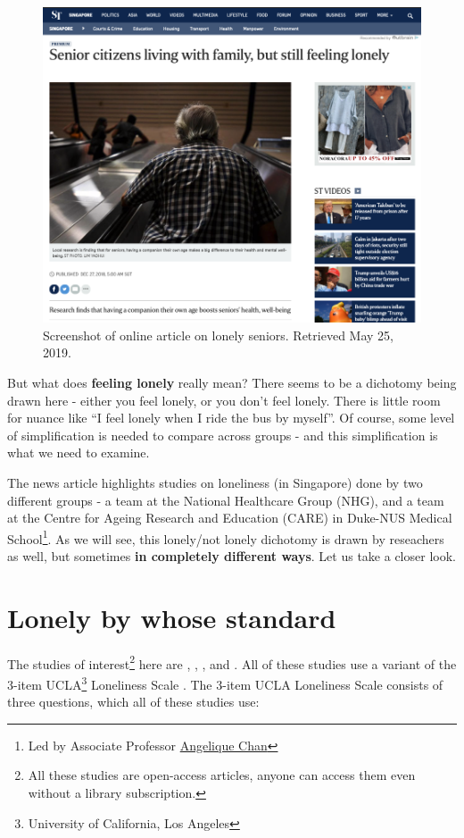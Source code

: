 \documentclass[openany]{book}
\let\rmarkdownfootnote\footnote%
\def\footnote{\protect\rmarkdownfootnote}
\begin{document}
\begin{figure}

{\centering \includegraphics[width=0.8\linewidth]{images/loneliness/livingarr} 

}

\caption{Screenshot of online article on lonely seniors. Retrieved May 25, 2019.}\label{fig:st-lonely}
\end{figure}

But what does \textbf{feeling lonely} really mean? There seems to be a
dichotomy being drawn here - either you feel lonely, or you don't feel
lonely. There is little room for nuance like ``I feel lonely when I ride
the bus by myself''. Of course, some level of simplification is needed
to compare across groups - and this simplification is what we need to
examine.

The news article highlights studies on loneliness (in Singapore) done by
two different groups - a team at the National Healthcare Group (NHG),
and a team at the Centre for Ageing Research and Education (CARE) in
Duke-NUS Medical School\footnote{Led by Associate Professor
  \href{https://www.duke-nus.edu.sg/hssr/our-team/faculty/faculty-staff-details/Detail/13200}{Angelique
  Chan}}. As we will see, this lonely/not lonely dichotomy is drawn by
reseachers as well, but sometimes \textbf{in completely different ways}.
Let us take a closer look.

\section{Lonely by whose standard}\label{lonely-by-whose-standard}

The studies of interest\footnote{All these studies are open-access
  articles, anyone can access them even without a library subscription.}
here are \citet{wee_loneliness_2019}, \citet{ge_social_2017},
\citet{lim_association_2017}, and \citet{chan_loneliness_2015}. All of
these studies use a variant of the 3-item UCLA\footnote{University of
  California, Los Angeles} Loneliness Scale \citep{hughes_short_2004}.
The 3-item UCLA Loneliness Scale consists of three questions, which all
of these studies use:
\end{document}
